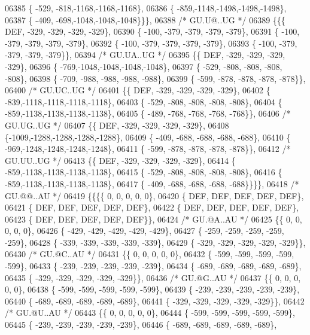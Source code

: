 \begin{DoxyCode}
06385 \{ -529, -818,-1168,-1168,-1168\},
06386 \{ -859,-1148,-1498,-1498,-1498\},
06387 \{ -409, -698,-1048,-1048,-1048\}\}\},
06388 \textcolor{comment}{/* GU.U@..UG */}
06389 \{\{\{  DEF, -329, -329, -329, -329\},
06390 \{ -100, -379, -379, -379, -379\},
06391 \{ -100, -379, -379, -379, -379\},
06392 \{ -100, -379, -379, -379, -379\},
06393 \{ -100, -379, -379, -379, -379\}\},
06394 \textcolor{comment}{/* GU.UA..UG */}
06395 \{\{  DEF, -329, -329, -329, -329\},
06396 \{ -769,-1048,-1048,-1048,-1048\},
06397 \{ -529, -808, -808, -808, -808\},
06398 \{ -709, -988, -988, -988, -988\},
06399 \{ -599, -878, -878, -878, -878\}\},
06400 \textcolor{comment}{/* GU.UC..UG */}
06401 \{\{  DEF, -329, -329, -329, -329\},
06402 \{ -839,-1118,-1118,-1118,-1118\},
06403 \{ -529, -808, -808, -808, -808\},
06404 \{ -859,-1138,-1138,-1138,-1138\},
06405 \{ -489, -768, -768, -768, -768\}\},
06406 \textcolor{comment}{/* GU.UG..UG */}
06407 \{\{  DEF, -329, -329, -329, -329\},
06408 \{-1009,-1288,-1288,-1288,-1288\},
06409 \{ -409, -688, -688, -688, -688\},
06410 \{ -969,-1248,-1248,-1248,-1248\},
06411 \{ -599, -878, -878, -878, -878\}\},
06412 \textcolor{comment}{/* GU.UU..UG */}
06413 \{\{  DEF, -329, -329, -329, -329\},
06414 \{ -859,-1138,-1138,-1138,-1138\},
06415 \{ -529, -808, -808, -808, -808\},
06416 \{ -859,-1138,-1138,-1138,-1138\},
06417 \{ -409, -688, -688, -688, -688\}\}\}\},
06418 \textcolor{comment}{/* GU.@@..AU */}
06419 \{\{\{\{    0,    0,    0,    0,    0\},
06420 \{  DEF,  DEF,  DEF,  DEF,  DEF\},
06421 \{  DEF,  DEF,  DEF,  DEF,  DEF\},
06422 \{  DEF,  DEF,  DEF,  DEF,  DEF\},
06423 \{  DEF,  DEF,  DEF,  DEF,  DEF\}\},
06424 \textcolor{comment}{/* GU.@A..AU */}
06425 \{\{    0,    0,    0,    0,    0\},
06426 \{ -429, -429, -429, -429, -429\},
06427 \{ -259, -259, -259, -259, -259\},
06428 \{ -339, -339, -339, -339, -339\},
06429 \{ -329, -329, -329, -329, -329\}\},
06430 \textcolor{comment}{/* GU.@C..AU */}
06431 \{\{    0,    0,    0,    0,    0\},
06432 \{ -599, -599, -599, -599, -599\},
06433 \{ -239, -239, -239, -239, -239\},
06434 \{ -689, -689, -689, -689, -689\},
06435 \{ -329, -329, -329, -329, -329\}\},
06436 \textcolor{comment}{/* GU.@G..AU */}
06437 \{\{    0,    0,    0,    0,    0\},
06438 \{ -599, -599, -599, -599, -599\},
06439 \{ -239, -239, -239, -239, -239\},
06440 \{ -689, -689, -689, -689, -689\},
06441 \{ -329, -329, -329, -329, -329\}\},
06442 \textcolor{comment}{/* GU.@U..AU */}
06443 \{\{    0,    0,    0,    0,    0\},
06444 \{ -599, -599, -599, -599, -599\},
06445 \{ -239, -239, -239, -239, -239\},
06446 \{ -689, -689, -689, -689, -689\},

\end{DoxyCode}
